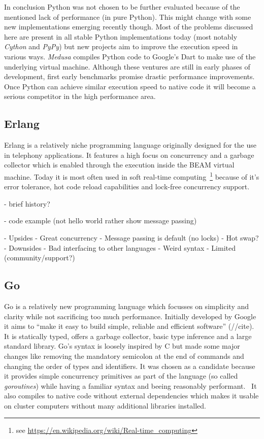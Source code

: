In conclusion Python was not chosen to be further evaluated because of the mentioned lack of performance (in pure Python). This might change with some new implementations emerging recently though. Most of the problems discussed here are present in all stable Python implementations today (most notably \textit{Cython} and \textit{PyPy}) but new projects aim to improve the execution speed in various ways. \textit{Medusa} compiles Python code to Google's Dart to make use of the underlying virtual machine. Although these ventures are still in early phases of development, first early benchmarks promise drastic performance improvements. Once Python can achieve similar execution speed to native code it will become a serious competitor in the high performance area.

\subsection*{Erlang}
\label{subsec:State_of_the_art::Candidates::Erlang}

Erlang is a relatively niche programming language originally designed for the use in telephony applications. It features a high focus on concurrency and a garbage collector which is enabled through the execution inside the BEAM virtual machine. Today it is most often used in soft real-time computing~\footnote{see \url{https://en.wikipedia.org/wiki/Real-time_computing}} because of it's error tolerance, hot code reload capabilities and lock-free concurrency support.



- brief history?

- code example (not hello world rather show message passing)

- Upsides
    - Great concurrency
    - Message passing is default (no locks)
    - Hot swap?
- Downsides
    - Bad interfacing to other languages
    - Weird syntax
    - Limited (community/support?)


\subsection*{Go}
\label{subsec:State_of_the_art::Candidates::Go}

Go is a relatively new programming language which focusses on simplicity and clarity while not sacrificing too much performance. Initially developed by Google it aims to ``make it easy to build simple, reliable and efficient software'' (//cite). It is statically typed, offers a garbage collector, basic type inference and a large standard library. Go's syntax is loosely inspired by C but made some major changes like removing the mandatory semicolon at the end of commands and changing the order of types and identifiers. It was chosen as a candidate because it provides simple concurrency primitives as part of the language (so called \textit{goroutines}) while having a familiar syntax and beeing reasonably performant.~\cite{intro_go} It also compiles to native code without external dependencies which makes it usable on cluster computers without many additional libraries installed.

